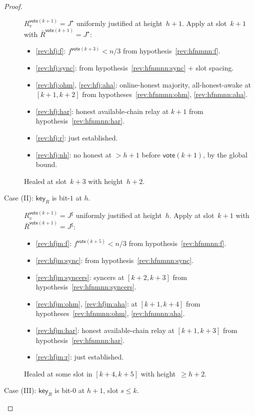 \ifx\litemode\undefined\documentclass{article}\fi
\newcommand{\key}{\mathsf{key}}
\newcommand{\vote}{\mathsf{vote}}
\newcommand{\comm}[1]{\bar{#1}}
\theoremstyle{plain}
\theoremstyle{definition}
\theoremstyle{remark}
\newcommand{\OHM}{online-honest majority\xspace}
\newcommand{\HAR}{honest available-chain relay\xspace}
\newcommand{\AHA}{all-honest-awake\xspace}
\begin{document}
\begin{proof}
\begin{description}
$R_v^{\vote(k+1)} = J^\star$ uniformly justified at height~$h+1$. Apply  at slot~$k+1$ with $\comm{R}^{\vote(k+1)} = J^\star$:
\begin{itemize}
  \item \ref{rev:hfj:f}: $f^{\vote(k+3)} < n/3$ from hypothesis~\ref{rev:hfnmnn:f}.
  \item \ref{rev:hfj:sync}: from hypothesis~\ref{rev:hfnmnn:sync} + slot spacing.
  \item \ref{rev:hfj:ohm}, \ref{rev:hfj:aha}: \OHM, \AHA at $[k+1, k+2]$ from hypotheses~\ref{rev:hfnmnn:ohm}, \ref{rev:hfnmnn:aha}.
  \item \ref{rev:hfj:har}: \HAR at $k+1$ from hypothesis~\ref{rev:hfnmnn:har}.
  \item \ref{rev:hfj:r}: just established.
  \item \ref{rev:hfj:nh}: no honest at $> h+1$ before $\vote(k+1)$, by the global bound.
\end{itemize}
Healed at slot~$k+3$ with height~$h+2$.

\item[{Case (II): $\key_R$ is bit-$1$ at $h$.}]\hfill

$R_v^{\vote(k+1)} = J^\sharp$ uniformly justified at height~$h$. Apply  at slot~$k+1$ with $\comm{R}^{\vote(k+1)} = J^\sharp$:
\begin{itemize}
  \item \ref{rev:hfjm:f}: $f^{\vote(k+5)} < n/3$ from hypothesis~\ref{rev:hfnmnn:f}.
  \item \ref{rev:hfjm:sync}: from hypothesis~\ref{rev:hfnmnn:sync}.
  \item \ref{rev:hfjm:syncers}: syncers at $[k+2, k+3]$ from hypothesis~\ref{rev:hfnmnn:syncers}.
  \item \ref{rev:hfjm:ohm}, \ref{rev:hfjm:aha}: at $[k+1, k+4]$ from hypotheses~\ref{rev:hfnmnn:ohm}, \ref{rev:hfnmnn:aha}.
  \item \ref{rev:hfjm:har}: \HAR at $[k+1, k+3]$ from hypothesis~\ref{rev:hfnmnn:har}.
  \item \ref{rev:hfjm:r}: just established.
\end{itemize}
Healed at some slot in $[k+4, k+5]$ with height~$\geq h+2$.

\item[{Case (III): $\key_R$ is bit-$0$ at $h+1$, slot $s \leq k$.}]\hfill


\end{description}
\end{proof}
\end{document}
